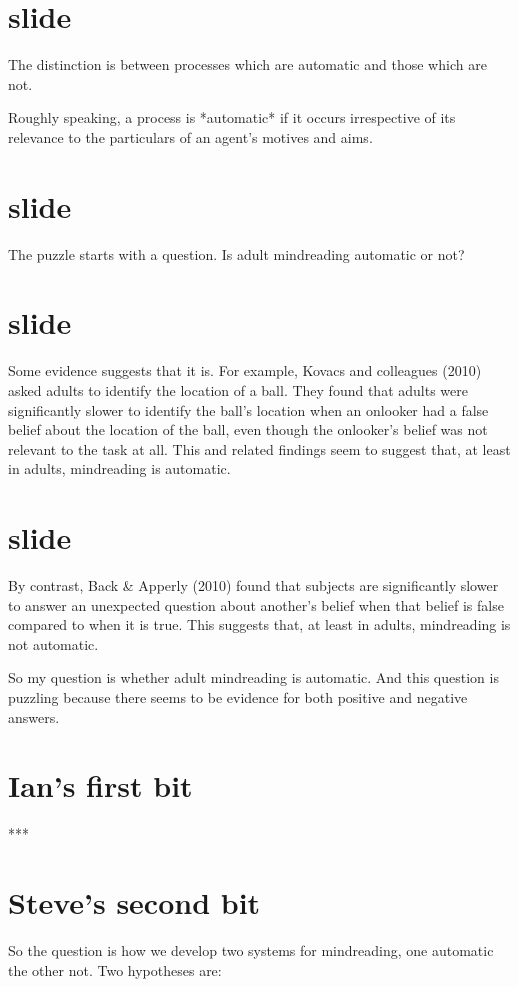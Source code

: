 \documentclass[14pt,\papersize]{extarticle}
\begin{document}
\section{slide}
The distinction is between processes which are automatic 
and those which are not.

Roughly speaking,
a process is *automatic* if it occurs irrespective of its relevance to the particulars of an agent's motives and aims.  

\section{slide}
The puzzle starts with a question.
Is adult mindreading automatic or not?

\section{slide}
Some evidence suggests that it is.
For example,
Kovacs and colleagues (2010) asked adults to identify the location of a ball.
They found that adults were significantly slower to identify the ball's location when an onlooker had a false belief about the location of the ball,
even though the onlooker's belief was not relevant to the task at all.
This and related findings seem to suggest that, at least in adults, mindreading is automatic.

\section{slide}
By contrast,
Back \& Apperly (2010) found that subjects are significantly slower to answer an unexpected question about another's belief when that belief is false compared to when it is true.
This suggests that, at least in adults, mindreading is not automatic.

So my question is whether adult mindreading is automatic.
And this question is puzzling because there seems to be evidence for both positive and negative answers.

\section{Ian's first bit}
***

\section{Steve's second bit}
So the question is how we develop two systems for mindreading, one automatic the other not. Two hypotheses are:
\end{document}
